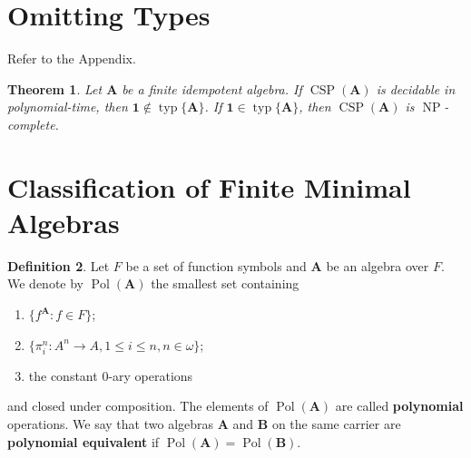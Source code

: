 \documentclass{amsart}
\theoremstyle{plain}
\newtheorem{theorem}{Theorem}[section]
\newtheorem{lemma}[theorem]{Lemma}
\theoremstyle{definition}
\newtheorem{definition}[theorem]{Definition}
\theoremstyle{remark}
\DeclareMathOperator{\Clo}{Clo}
\DeclareMathOperator{\CSP}{CSP}
\DeclareMathOperator{\Pol}{Pol}
\DeclareMathOperator{\NP}{NP}
\DeclareMathOperator{\typ}{typ}
\begin{document}
\begin{comment}
\begin{lemma}
    Let $\EuScript{A}$ be a relational structure. 
    If $\Pol(\EuScript{A})$ contains a majority operation, $\CSP(\EuScript{\EuScript{A}})$ is polynomial-time decidable. 
\end{lemma}

\begin{theorem}
    Let $\mathbf{A}$ be a finite strictly simple surjective algebra.
    If all the elements of $\Clo(\mathbf{A})$ are essentially unary, then $\CSP(\mathbf{A})$ is $\NP$-complete. 
    Otherwise, $\CSP(\mathbf{A})$ is polynomial-time decidable. 
    \begin{proof}

    \end{proof}
\end{theorem}
\end{comment}

\section{Omitting Types}
Refer to the Appendix. 

\begin{theorem}
    Let $\mathbf{A}$ be a finite idempotent algebra. 
    If $\CSP(\mathbf{A})$ is decidable in polynomial-time, then $\mathbf{1} \notin \typ\{\mathbf{A}\}$.  
    If $\mathbf{1} \in \typ\{\mathbf{A}\}$, then $\CSP(\mathbf{A})$ is $\NP$-complete. 
\end{theorem}

\appendix
\section{Classification of Finite Minimal Algebras}

\begin{definition}
    Let $F$ be a set of function symbols and $\mathbf{A}$ be an algebra over $F$. 
    We denote by $\Pol(\mathbf{A})$ the smallest set containing 
    \begin{enumerate}
        \item $\{f^\mathbf{A}: f \in F\}$; 
        \item $\{\pi^n_i: A^n \to A, 1 \le i \le n, n \in \omega\}$; 
        \item the constant $0$-ary operations
    \end{enumerate}
and closed under composition. 
The elements of $\Pol(\mathbf{A})$ are called \textbf{polynomial} operations. 
We say that two algebras $\mathbf{A}$ and $\mathbf{B}$ on the same carrier are \textbf{polynomial equivalent} if $\Pol(\mathbf{A})=\Pol(\mathbf{B})$. 
\end{definition}
\end{document}
